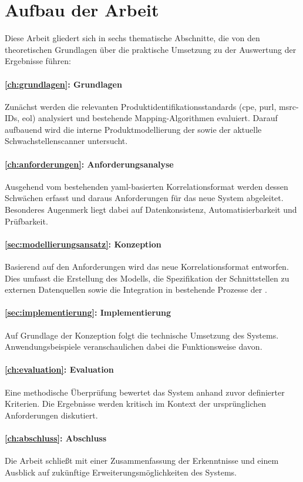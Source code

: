 \section{Aufbau der Arbeit}\label{sec:arbeit-aufbau}

Diese Arbeit gliedert sich in sechs thematische Abschnitte, die von den theoretischen Grundlagen über die praktische Umsetzung zu der Auswertung der Ergebnisse führen:

\paragraph{\autoref{ch:grundlagen}: Grundlagen}
Zunächst werden die relevanten Produktidentifikationsstandards (\acrshort{cpe}, \acrshort{purl}, \acrshort{msrc}-IDs, \acrshort{eol}) analysiert und bestehende Mapping-Algorithmen evaluiert.
Darauf aufbauend wird die interne Produktmodellierung der \metaeffektsp sowie der aktuelle Schwachstellenscanner untersucht.

\paragraph{\autoref{ch:anforderungen}: Anforderungsanalyse}
Ausgehend vom bestehenden \acrshort{yaml}-basierten Korrelationsformat werden dessen Schwächen erfasst und daraus Anforderungen für das neue System abgeleitet.
Besonderes Augenmerk liegt dabei auf Datenkonsistenz, Automatisierbarkeit und Prüfbarkeit.

\paragraph{\autoref{sec:modellierungsansatz}: Konzeption}
Basierend auf den Anforderungen wird das neue Korrelationsformat entworfen.
Dies umfasst die Erstellung des Modells, die Spezifikation der Schnittstellen zu externen Datenquellen sowie die Integration in bestehende Prozesse der \metaeffekt.

\paragraph{\autoref{sec:implementierung}: Implementierung}
Auf Grundlage der Konzeption folgt die technische Umsetzung des Systems.
Anwendungsbeispiele veranschaulichen dabei die Funktionsweise davon.

\paragraph{\autoref{ch:evaluation}: Evaluation}
Eine methodische Überprüfung bewertet das System anhand zuvor definierter Kriterien.
Die Ergebnisse werden kritisch im Kontext der ursprünglichen Anforderungen diskutiert.

\paragraph{\autoref{ch:abschluss}: Abschluss}
Die Arbeit schließt mit einer Zusammenfassung der Erkenntnisse und einem Ausblick auf zukünftige Erweiterungsmöglichkeiten des Systems.
